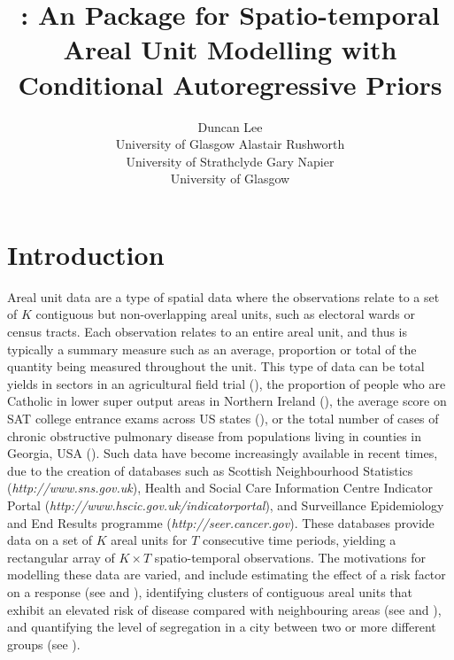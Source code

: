 \documentclass[article,shortnames,nojss]{jss}
\author{Duncan Lee\\University of Glasgow \And Alastair Rushworth\\University of Strathclyde \And Gary Napier\\University of Glasgow}
\title{\pkg{CARBayesST}: An \proglang{R} Package for Spatio-temporal Areal Unit Modelling  with Conditional Autoregressive Priors}
\begin{document}


\section{Introduction}
Areal unit data are a type of spatial data where the observations relate to a set of $K$ contiguous but non-overlapping areal units, such as electoral wards or census tracts. Each observation relates to an entire areal unit, and thus is typically a summary measure such as an average, proportion or total of the quantity being measured throughout the unit. This type of data can be total yields in sectors in an agricultural field trial (\citealp{besag1999}), the proportion of people who are Catholic in lower super output areas in Northern Ireland (\citealp{lee2015}), the average score on SAT college entrance exams across US states (\citealp{wall2004}), or the total number of cases of chronic obstructive pulmonary disease from populations living in counties in Georgia, USA (\citealp{choiENV11}). Such data have become increasingly available in recent times, due to the creation of databases such as Scottish Neighbourhood Statistics (\emph{http://www.sns.gov.uk}), Health and Social Care Information Centre Indicator Portal (\emph{http://www.hscic.gov.uk/indicatorportal}), and Surveillance Epidemiology and End Results programme (\emph{http://seer.cancer.gov}). These databases provide data on a set of $K$ areal units for $T$ consecutive time periods, yielding a rectangular array of $K\times T$ spatio-temporal observations. The motivations for modelling these data are varied, and include estimating the effect of a risk factor on a response (see \citealp{wakefield2007} and \citealp{lee2009}), identifying clusters of contiguous areal units that exhibit an elevated risk of disease compared with neighbouring areas (see \citealp{charras2012} and \citealp{anderson2014}), and quantifying the level of segregation in a city between two or more different groups (see \citealp{lee2015}).\\
\end{document}
